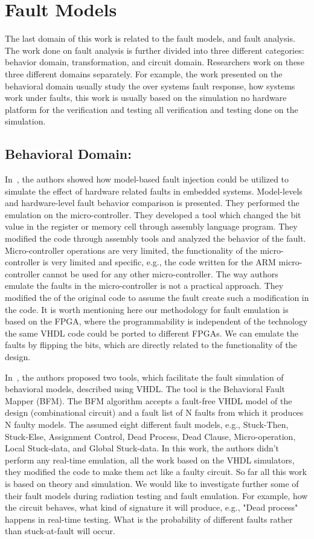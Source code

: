 \section{Fault Models}
The last domain of this work is related to the fault models, and fault analysis. The work done on fault analysis is further divided into three different categories: behavior domain, transformation, and circuit domain. Researchers work on these three different domains separately. For example, the work presented on the behavioral domain usually study the over systems fault response, how systems work under faults, this work is usually based on the simulation no hardware platform for the verification and testing all verification and testing done on the simulation.

\subsection{Behavioral Domain:}
\label{faultmodels}
In~\citep{svenningsson2010model}, the authors showed how model-based fault injection could be utilized to
simulate the effect of hardware related faults in embedded systems. Model-levels and hardware-level
fault behavior comparison is presented. They performed the emulation on the micro-controller. They developed a tool which changed the bit value in the register or memory cell through assembly language program. They modified the code through assembly tools and analyzed the behavior of the fault. Micro-controller operations are very limited, the functionality of the micro-controller is very limited and specific, e.g., the code written for the ARM micro-controller cannot be used for any other micro-controller. The way authors emulate the faults in the micro-controller is not a practical approach. They modified the  of the original code to assume the fault create such a modification in the code. It is worth mentioning here our methodology for fault emulation is based on the FPGA, where the programmability is independent of the technology the same VHDL code could be ported to different FPGAs. We can emulate the faults by flipping the bits, which are directly related to the functionality of the design.

In~\citep{hayne1999behavioral}, the authors proposed two tools, which facilitate the fault simulation of behavioral
models, described using VHDL. The tool is the Behavioral Fault Mapper (BFM). The BFM algorithm
accepts a fault-free VHDL model of the design (combinational circuit) and a fault list of N faults from
which it produces N faulty models. The assumed eight different fault models, e.g., Stuck-Then, Stuck-Else,
Assignment Control, Dead Process, Dead Clause, Micro-operation, Local Stuck-data, and Global Stuck-data.  In this work, the authors didn't perform any real-time emulation, all the work based on the VHDL simulators, they modified the code to make them act like a  faulty circuit. So far all this work is based on theory and simulation. We would like to investigate further some of their fault models during radiation testing and fault emulation. For example, how the circuit behaves, what kind of signature it will produce, e.g.,  "Dead process" happens in real-time testing.  What is the probability of different faults rather than stuck-at-fault will occur.


